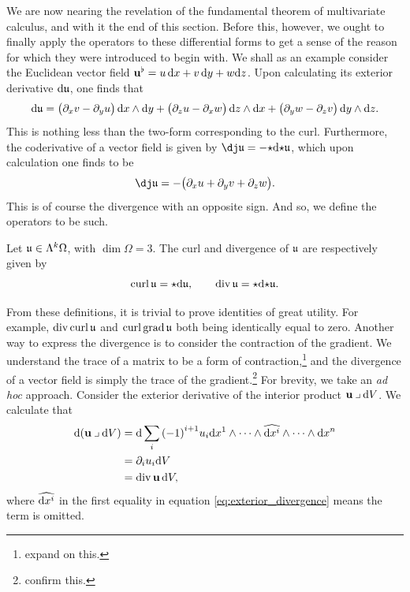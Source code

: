We are now nearing the revelation of the fundamental theorem of multivariate calculus, and with it the end of this section.
Before this, however, we ought to finally apply the operators to these differential forms to get a sense of the reason for which they were introduced to begin with.
We shall as an example consider the Euclidean vector field $\mathbf{u}^{\flat} = u\,\mathrm{d} x + v\,\mathrm{d} y + w\mathrm{d} z$.
Upon calculating its exterior derivative $\mathrm{d}\mathfrak{u}$, one finds that
\[
        \mathrm{d}\mathfrak{u} = \big( \partial_x v - \partial_y u \big)\,\mathrm{d} x \wedge \mathrm{d} y + \big( \partial_z u - \partial_x w \big)\,\mathrm{d} z \wedge \mathrm{d} x + \big( \partial_y w - \partial_z v \big)\,\mathrm{d} y \wedge \mathrm{d} z.
\]
This is nothing less than the two-form corresponding to the curl.
Furthermore, the coderivative of a vector field is given by $\codee\ufrak = -{\star}\dee{\star}\ufrak$, which upon calculation one finds to be
  \[
        \codee\ufrak = -\big(\deex u + \deey v + \deez w \big).
  \]
This is of course the divergence with an opposite sign.
And so, we define the operators to be such.

\begin{definition}
  Let $\mathfrak{u} \in \Lambda^{k}\Omega$, with $\dim\Omega = 3$.
  The curl and divergence of $\mathfrak{u}$ are respectively given by
  \[
        \operatorname{curl}{\mathfrak{u}} = \star\mathrm{d}\mathfrak{u}, \qquad \operatorname{div}{\mathfrak{u}} = \star\mathrm{d}{\star}\mathfrak{u}.
  \]
\end{definition}

\noindent From these definitions, it is trivial to prove identities of great utility.
For example, $\operatorname{div}\operatorname{curl}\mathfrak{u}$ and $\operatorname{curl}\operatorname{grad}\mathfrak{u}$ both being identically equal to zero.
Another way to express the divergence is to consider the contraction of the gradient.
We understand the trace of a matrix to be a form of contraction,\footnote{expand on this.} and the divergence of a vector field is simply the trace of the gradient.\footnote{confirm this.}
For brevity, we take an \emph{ad hoc} approach.
Consider the exterior derivative of the interior product $\uvec\iprod\dee V$.
We calculate that
\begin{equation}\label{eq:exterior_divergence}
        \begin{aligned}
           \dee(\uvec\iprod\dee V) &= \dee\sum_{i} {(-1)}^{i+1} u_i \dee x^{1} \wedge \cdots \wedge \widehat{\dee x^{i}} \wedge \cdots \wedge \dee x^{n}\\
           &= \partial_i u_i \dee V \\
           &= \Div\uvec\,\dee V,
        \end{aligned}
\end{equation}
where $\widehat{\mathrm{d} x^{i}}$ in the first equality in equation \eqref{eq:exterior_divergence} means the term is omitted.

